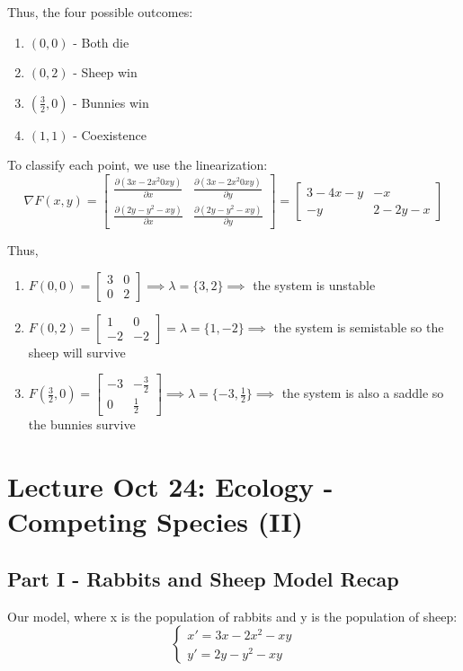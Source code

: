 \documentclass[12pt]{article}
\begin{document}
Thus, the four possible outcomes:
\begin{enumerate}
    \item $(0, 0)$ - Both die 
    \item $(0, 2)$ - Sheep win
    \item $(\frac{3}{2}, 0)$ - Bunnies win 
    \item $(1, 1)$ - Coexistence
\end{enumerate}

To classify each point, we use the linearization:
\[\nabla F(x, y) = \begin{bmatrix}
    \frac{\partial (3x - 2x^2 0 xy)}{\partial x} & \frac{\partial (3x - 2x^2 0 xy)}{\partial y}\\
    \frac{\partial (2y - y^2 - xy)}{\partial x} & \frac{\partial (2y- y^2 - xy)}{\partial y}
\end{bmatrix} = \begin{bmatrix}
    3 - 4x - y & -x\\
    -y & 2 - 2y - x
\end{bmatrix}\]

Thus,
\begin{enumerate}
    \item $F(0, 0) = \begin{bmatrix}
        3 & 0 \\
        0 & 2
    \end{bmatrix} \implies \lambda = \{3, 2\} \implies$ the system is unstable 
    \item $F(0, 2) = \begin{bmatrix}
        1 & 0\\
        -2 & -2
    \end{bmatrix} = \lambda = \{1, -2\} \implies$ the system is semistable so the sheep will survive
    \item $F(\frac{3}{2}, 0) = \begin{bmatrix}
        -3 & -\frac{3}{2}\\
        0 & \frac{1}{2}
    \end{bmatrix} \implies \lambda = \{-3, \frac{1}{2}\} \implies $ the system is also a saddle so the bunnies survive
\end{enumerate}

\section{Lecture Oct 24: Ecology - Competing Species (II)}
\subsection*{Part I - Rabbits and Sheep Model Recap}
Our model, where x is the population of rabbits and y is the population of sheep:
\[\begin{cases}
    x' = 3x - 2x^2 - xy\\
    y' = 2y - y^2 - xy
\end{cases}\]
\end{document}

